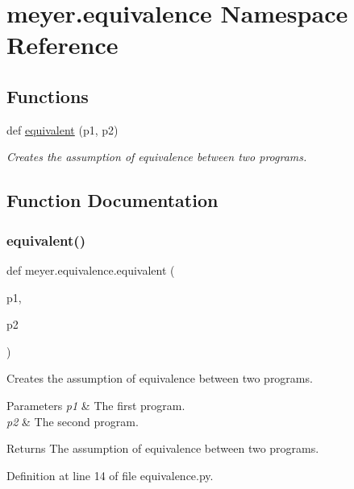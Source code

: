 \hypertarget{namespacemeyer_1_1equivalence}{}\section{meyer.\+equivalence Namespace Reference}
\label{namespacemeyer_1_1equivalence}
\subsection*{Functions}
\begin{DoxyCompactItemize}
\item 
def \hyperlink{namespacemeyer_1_1equivalence_a74265e413d441b88ad03f99cd367c4ea}{equivalent} (p1, p2)
\begin{DoxyCompactList}\small\item\em Creates the assumption of equivalence between two programs. \end{DoxyCompactList}\end{DoxyCompactItemize}


\subsection{Function Documentation}
\mbox{\label{namespacemeyer_1_1equivalence_a74265e413d441b88ad03f99cd367c4ea}} 
\subsubsection{\texorpdfstring{equivalent()}{equivalent()}}
{\footnotesize\ttfamily def meyer.\+equivalence.\+equivalent (\begin{DoxyParamCaption}\item[{}]{p1,  }\item[{}]{p2 }\end{DoxyParamCaption})}



Creates the assumption of equivalence between two programs. 


\begin{DoxyParams}{Parameters}
{\em p1} & The first program. \\
\hline
{\em p2} & The second program. \\
\hline
\end{DoxyParams}
\begin{DoxyReturn}{Returns}
The assumption of equivalence between two programs. 
\end{DoxyReturn}


Definition at line 14 of file equivalence.\+py.

